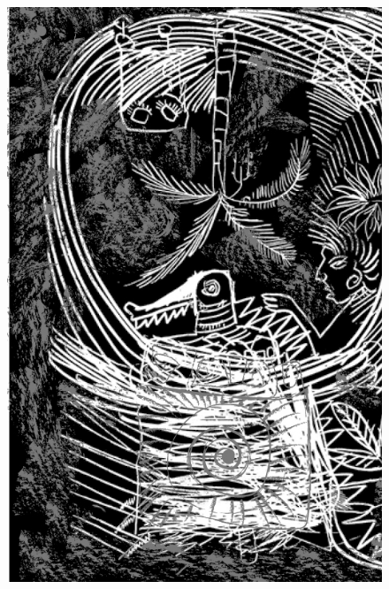 \begin{figure}
\vspace*{-1.2cm}
\hspace*{-2.2cm}\includegraphics[width=138mm]{./imgs/img6.jpg}
\end{figure}

\chapter*{}


